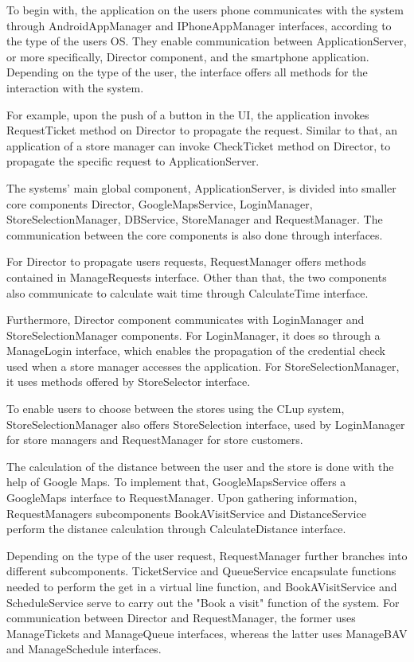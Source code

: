To begin with, the application on the users phone communicates with the system through AndroidAppManager and IPhoneAppManager interfaces, according to the type of the users OS. They enable communication between ApplicationServer, or more specifically, Director component, and the smartphone application. Depending on the type of the user, the interface offers all methods for the interaction with the system. 

For example, upon the push of a button in the UI, the application invokes RequestTicket method on Director to propagate the request. Similar to that, an application of a store manager can invoke CheckTicket method on Director, to propagate the specific request to ApplicationServer. \newline
 

The systems' main global component, ApplicationServer, is divided into smaller core components Director, GoogleMapsService, LoginManager, StoreSelectionManager, DBService, StoreManager and RequestManager. The communication between the core components is also done through interfaces. 

For Director to propagate users requests, RequestManager offers methods contained in ManageRequests interface. Other than that, the two components also communicate to calculate wait time through CalculateTime interface. 

Furthermore, Director component communicates with LoginManager and StoreSelectionManager components. For LoginManager, it does so through a ManageLogin interface, which enables the propagation of the credential check used when a store manager accesses the application. For StoreSelectionManager, it uses methods offered by StoreSelector interface. \newline

To enable users to choose between the stores using the CLup system, StoreSelectionManager also offers StoreSelection interface, used by LoginManager for store managers and RequestManager for store customers. 

The calculation of the distance between the user and the store is done with the help of Google Maps. To implement that, GoogleMapsService offers a GoogleMaps interface to RequestManager. Upon gathering information, RequestManagers subcomponents BookAVisitService and DistanceService perform the distance calculation through CalculateDistance interface. \newline

Depending on the type of the user request, RequestManager further branches into different subcomponents. TicketService and QueueService encapsulate functions needed to perform the get in a virtual line function, and BookAVisitService and ScheduleService serve to carry out the "Book a visit" function of the system. For communication between Director and RequestManager, the former uses ManageTickets and ManageQueue interfaces, whereas the latter uses ManageBAV and ManageSchedule interfaces. \newline

